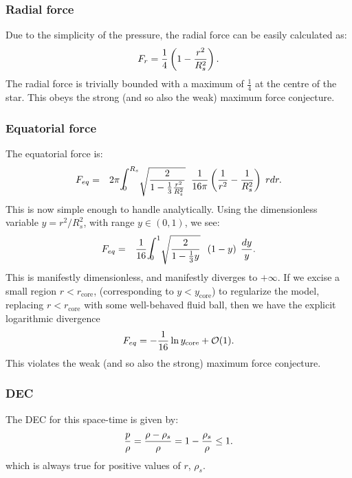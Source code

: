 \documentclass[12pt]{article}
\begin{document}
\subsubsection{Radial force}
Due to the simplicity of the pressure, the radial force can be easily calculated as:
%
\begin{equation}
    F_r =  \frac{1}{4}\left(1 -{r^2\over R_s^2}\right).
\end{equation}
The radial force is trivially bounded with a maximum of $\frac{1}{4}$ at the centre of the star. 
This  obeys the strong (and so also the weak) maximum force conjecture.

\subsubsection{Equatorial force}
The equatorial force is:
%
\begin{eqnarray}F_{eq} &=& 2\pi\hbox{\Large $\displaystyle\int$}^{{R_s}}_{\!\!\!\!\!0}
\sqrt{ 2 \over1-{1\over3}{r^2\over R_s^2}}\;\;
\frac{1}{16\pi}\left(\frac{1}{r^2} -{1\over R_s^2}\right)\; r dr.
\end{eqnarray}
%
This is now simple enough to handle analytically. Using the dimensionless variable $y= r^2/R_s^2$, with range $y\in(0,1)$, we see:
\begin{eqnarray}F_{eq} &=& {1\over16} \hbox{\Large $\displaystyle\int$}^{1}_{\!\!\!\!\!0}
\sqrt{ 2 \over1-{1\over3}{y}}\;\;
\left(1-y\right)\; {dy\over y}.
\end{eqnarray}
This is manifestly dimensionless, and manifestly diverges to $+\infty$. 
If we excise a small region  $r<r_\mathrm{core}$, (corresponding to $y < y_\mathrm{core}$) to regularize the model, replacing $r<r_\mathrm{core}$
with some well-behaved fluid ball, then we have the explicit logarithmic divergence
\begin{equation}
F_{eq} = -{1\over16} \ln y_\mathrm{core} + {\mathcal{O}}(1).
\end{equation}
This  violates the weak (and so also the strong) maximum force conjecture.

\subsubsection{DEC}
The DEC for this space-time is given by:
%
\begin{eqnarray}
\frac{p}{\rho} = {\rho-\rho_s\over \rho} = 1 - {\rho_s\over\rho} \leq 1.
\end{eqnarray}
%
which is always true for positive values of $r$, $\rho_s$. 
\end{document}
